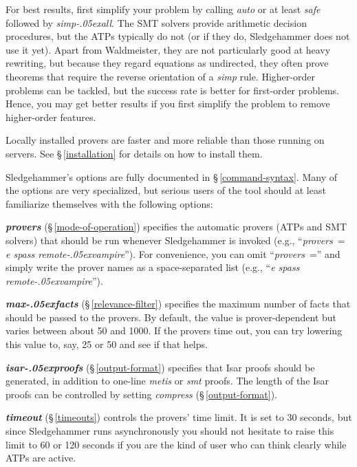 \documentclass[a4paper,12pt]{article}
\let\oldS=\S
\def\S{\oldS\,}
\renewcommand\_{\hbox{\textunderscore\kern-.05ex}}
\begin{document}

For best results, first simplify your problem by calling \textit{auto} or at
least \textit{safe} followed by \textit{simp\_all}. The SMT solvers provide
arithmetic decision procedures, but the ATPs typically do not (or if they do,
Sledgehammer does not use it yet). Apart from Waldmeister, they are not
particularly good at heavy rewriting, but because they regard equations as
undirected, they often prove theorems that require the reverse orientation of a
\textit{simp} rule. Higher-order problems can be tackled, but the success rate
is better for first-order problems. Hence, you may get better results if you
first simplify the problem to remove higher-order features.


Locally installed provers are faster and more reliable than those running on
servers. See \S\ref{installation} for details on how to install them.


Sledgehammer's options are fully documented in \S\ref{command-syntax}. Many of
the options are very specialized, but serious users of the tool should at least
familiarize themselves with the following options:

\begin{enum}
\item[\labelitemi] \textbf{\textit{provers}} (\S\ref{mode-of-operation}) specifies
the automatic provers (ATPs and SMT solvers) that should be run whenever
Sledgehammer is invoked (e.g., ``\textit{provers}~= \textit{e spass
remote\_vampire\/}''). For convenience, you can omit ``\textit{provers}~=''
and simply write the prover names as a space-separated list (e.g., ``\textit{e
spass remote\_vampire\/}'').

\item[\labelitemi] \textbf{\textit{max\_facts}} (\S\ref{relevance-filter})
specifies the maximum number of facts that should be passed to the provers. By
default, the value is prover-dependent but varies between about 50 and 1000. If
the provers time out, you can try lowering this value to, say, 25 or 50 and see
if that helps.

\item[\labelitemi] \textbf{\textit{isar\_proofs}} (\S\ref{output-format}) specifies
that Isar proofs should be generated, in addition to one-line \textit{metis} or
\textit{smt} proofs. The length of the Isar proofs can be controlled by setting
\textit{compress} (\S\ref{output-format}).

\item[\labelitemi] \textbf{\textit{timeout}} (\S\ref{timeouts}) controls the
provers' time limit. It is set to 30 seconds, but since Sledgehammer runs
asynchronously you should not hesitate to raise this limit to 60 or 120 seconds
if you are the kind of user who can think clearly while ATPs are active.
\end{enum}
\end{document}
